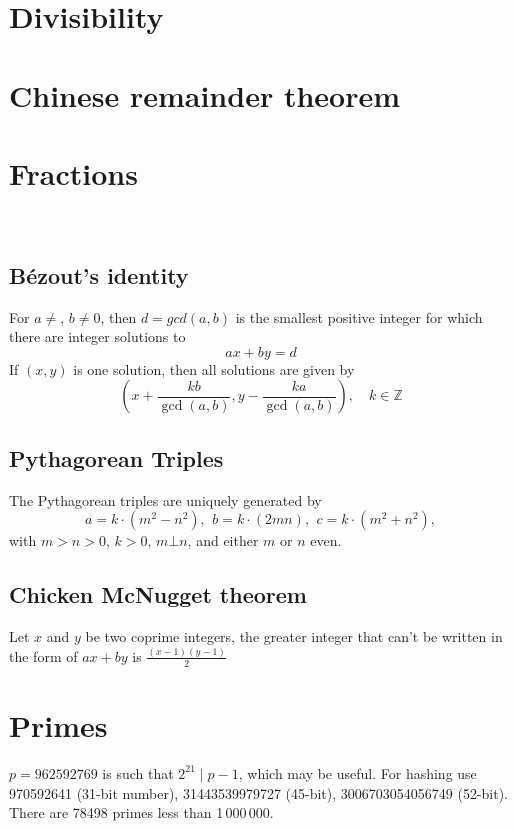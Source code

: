 \section{Divisibility}

\section{Chinese remainder theorem}

\section{Fractions}

\

\subsection{Bézout's identity}
For $a \neq $, $b \neq 0$, then $d=gcd(a,b)$ is the smallest positive integer for which there are integer solutions to
$$ax+by=d$$
If $(x,y)$ is one solution, then all solutions are given by
$$\left(x+\frac{kb}{\gcd(a,b)}, y-\frac{ka}{\gcd(a,b)}\right), \quad k\in\mathbb{Z}$$

\subsection{Pythagorean Triples}
 The Pythagorean triples are uniquely generated by
 \[ a=k\cdot (m^{2}-n^{2}),\ \,b=k\cdot (2mn),\ \,c=k\cdot (m^{2}+n^{2}), \]
 with $m > n > 0$, $k > 0$, $m \bot n$, and either $m$ or $n$ even.

\subsection{Chicken McNugget theorem}
	Let $x$ and $y$ be two coprime integers, the greater integer that can't be written in the form of $ax + by$ is $\frac{(x-1)(y-1)}{2}$

\section{Primes}
	$p=962592769$ is such that $2^{21} \mid p-1$, which may be useful. For hashing
	use 970592641 (31-bit number), 31443539979727 (45-bit), 3006703054056749
	(52-bit). There are 78498 primes less than 1\,000\,000.


